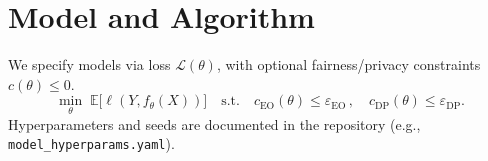 
\section{Model and Algorithm}
We specify models via loss $\mathcal{L}(\theta)$, with optional fairness/privacy constraints $c(\theta)\le 0$.
\begin{equation}
\min_{\theta}\; \mathbb{E}\big[\ell(Y, f_\theta(X))\big] \quad \text{s.t.}\quad
c_{\mathrm{EO}}(\theta)\le \varepsilon_{\mathrm{EO}}\,,\quad
c_{\mathrm{DP}}(\theta)\le \varepsilon_{\mathrm{DP}}.
\end{equation}
Hyperparameters and seeds are documented in the repository (e.g., \texttt{model\_hyperparams.yaml}).
